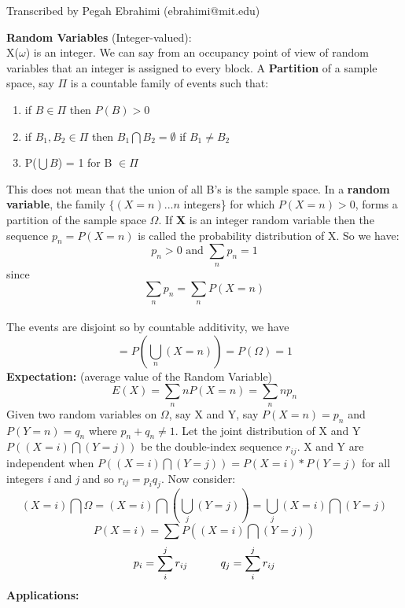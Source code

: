 \newline
{}\newline
\noindent Transcribed by Pegah Ebrahimi (ebrahimi@mit.edu)\newline

{\bf Random Variables} (Integer-valued):
\\
X($\omega$) is an integer. We can say from an occupancy point of view
of random variables that an integer is assigned to every block. A {\bf
Partition} of  a sample space, say $\Pi$ is a  countable family of events
such that:
\begin{enumerate}
\item
if $B \in \Pi$ then $P(B) > 0$
\item
if $B_{1}, B_{2} \in \Pi$ then $B_{1} \bigcap B_{2} = \emptyset$ if $B_{1} \neq B_{2}$
\item
P($\bigcup B$) = 1 for B $\in \Pi$    
\end{enumerate}
This does not mean that the union of all B's is the sample space. In a
{\bf random variable}, the family $\{(X = n)... n$ integers\} for which
$P(X = n)> 0$, forms a partition of the sample space $\Omega$. If {\bf
X} is an integer random variable then the sequence $p_n=P(X=n)$ is
called the probability distribution of X. So we have:
\begin{displaymath} p_n > 0 \mbox{ and } \sum_n p_n =1 \end{displaymath}
since 
\begin{displaymath} \sum_n p_n = \sum_n P(X = n)\end{displaymath}
\\
The events are disjoint so by countable additivity, we have
\begin{displaymath}=   P(\bigcup_n(X = n)) = P(\Omega) = 1\end{displaymath}
{\large\bf Expectation:}  (average value of the Random Variable)
\begin{displaymath}E(X)=\sum_n n P(X = n) = \sum_n n p_n\end{displaymath}
Given two random variables on $\Omega$, say X and Y, 
say $P(X = n) = p_n$ and $P(Y = n) = q_n$ where $p_n + q_n\neq1$. 
Let the joint distribution of X and Y $P((X = i)\bigcap(Y = j))$ 
be the double-index sequence $r_{ij}$.
X and Y are independent when $P((X = i)\bigcap(Y = j)) = P(X = i)* P(Y= j)$ for all integers {\it i} and {\it j}
 and so $r_{ij} = p_iq_j$. Now consider:\\
\begin{displaymath}(X = i)\bigcap \Omega = (X = i)\bigcap (\bigcup_j (Y= j)) = \bigcup_j (X = i) \bigcap (Y = j)\end{displaymath}
\begin{displaymath}P(X = i) = \sum P((X = i) \bigcap (Y = j))\end{displaymath}
\begin{displaymath}p_i = \sum_i^j r_{ij}\indent\indent q_j = \sum_i^j r_{ij}\end{displaymath}
{\large\bf Applications:}

